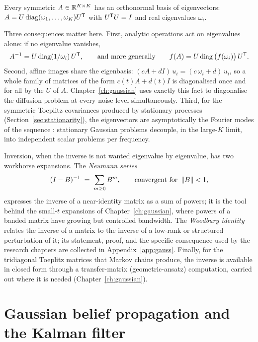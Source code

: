 \begin{theorem}
\label{thm:spectral}
Every symmetric $A \in \mathbb{R}^{K \times K}$ has an orthonormal basis of
eigenvectors: $A = U \operatorname{diag}(\omega_1, \dots, \omega_K)
U^{\mathsf{T}}$ with $U^{\mathsf{T}} U = I$ and real eigenvalues $\omega_i$.
\end{theorem}

Three consequences matter here. First, analytic operations act on
eigenvalues alone: if no eigenvalue vanishes,
\begin{equation*}
  A^{-1} = U \operatorname{diag}(1/\omega_i)\, U^{\mathsf{T}},
  \qquad\text{and more generally}\qquad
  f(A) = U \operatorname{diag}\big(f(\omega_i)\big)\, U^{\mathsf{T}} .
\end{equation*} Second, affine images
share the eigenbasis: $(cA + dI)\, u_i = (c\,\omega_i + d)\, u_i$, so a
whole family of matrices of the form $c(t) A + d(t) I$ is diagonalised
once and for all by the $U$ of $A$. Chapter~\ref{ch:gaussian} uses
exactly this fact to diagonalise the diffusion problem at every noise
level simultaneously. Third, for the symmetric
Toeplitz covariances produced by stationary processes
(Section~\ref{sec:stationarity}), the eigenvectors are asymptotically the
Fourier modes of the sequence \citep{brockwell1991time}: stationary
Gaussian problems decouple, in the large-$K$ limit, into independent
scalar problems per frequency.

Inversion, when the inverse is not wanted eigenvalue by eigenvalue, has
two workhorse expansions. The \emph{Neumann series}
\begin{equation}
  (I - B)^{-1} \;=\; \sum_{m \geq 0} B^m ,
  \qquad \text{convergent for } \left\lVert B \right\rVert < 1 ,
  \label{eq:neumann}
\end{equation}
expresses the inverse of a near-identity matrix as a sum of powers; it is
the tool behind the small-$t$ expansions of Chapter~\ref{ch:gaussian},
where powers of a banded matrix have growing but controlled bandwidth.
The \emph{Woodbury identity} relates the inverse of a matrix to the
inverse of a low-rank or structured perturbation of it; its statement,
proof, and the specific consequence used by the research chapters are
collected in Appendix~\ref{app:gauss}. Finally, for the tridiagonal
Toeplitz matrices that Markov chains produce, the inverse is available in
closed form through a transfer-matrix (geometric-ansatz) computation,
carried out where it is needed
(Chapter~\ref{ch:gaussian}).

\section{Gaussian belief propagation and the Kalman filter}
\label{sec:gaussian-bp}

